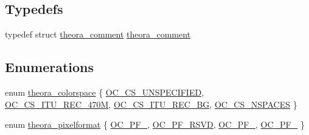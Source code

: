 \subsection*{Typedefs}
\begin{DoxyCompactItemize}
\item 
typedef struct \hyperlink{structtheora__comment}{theora\+\_\+comment} \hyperlink{group__oldfuncs_gaa504e8a56a4bf9c8e44f77d05aef0bb5}{theora\+\_\+comment}
\end{DoxyCompactItemize}
\subsection*{Enumerations}
\begin{DoxyCompactItemize}
\item 
enum \hyperlink{group__oldfuncs_gaa567da4ce591f7373149ce3ef3acdac9}{theora\+\_\+colorspace} \{ \hyperlink{group__oldfuncs_ggaa567da4ce591f7373149ce3ef3acdac9abf217cf83d7d7cbf73295e6689f5cf5f}{O\+C\+\_\+\+C\+S\+\_\+\+U\+N\+S\+P\+E\+C\+I\+F\+I\+ED}, 
\hyperlink{group__oldfuncs_ggaa567da4ce591f7373149ce3ef3acdac9ab20c9851a21ab148fef0bf2c00c0a294}{O\+C\+\_\+\+C\+S\+\_\+\+I\+T\+U\+\_\+\+R\+E\+C\+\_\+470M}, 
\hyperlink{group__oldfuncs_ggaa567da4ce591f7373149ce3ef3acdac9a04f8fa2da26f9ec513f514163705666a}{O\+C\+\_\+\+C\+S\+\_\+\+I\+T\+U\+\_\+\+R\+E\+C\+\_\+BG}, 
\hyperlink{group__oldfuncs_ggaa567da4ce591f7373149ce3ef3acdac9a640b572f11fa7102d434e1c605aaa186}{O\+C\+\_\+\+C\+S\+\_\+\+N\+S\+P\+A\+C\+ES}
 \}
\item 
enum \hyperlink{group__oldfuncs_gae169da05bfaaf4e964a6866552d45079}{theora\+\_\+pixelformat} \{ \hyperlink{group__oldfuncs_ggae169da05bfaaf4e964a6866552d45079a4e451af01be2645511b0e431f5225d2b}{O\+C\+\_\+\+P\+F\+\_}, 
\hyperlink{group__oldfuncs_ggae169da05bfaaf4e964a6866552d45079a7d21c63341ad299766839c83ed1216eb}{O\+C\+\_\+\+P\+F\+\_\+\+R\+S\+VD}, 
\hyperlink{group__oldfuncs_ggae169da05bfaaf4e964a6866552d45079a36a88c55b7ddd5aedeac2d61d57fee5b}{O\+C\+\_\+\+P\+F\+\_}, 
\hyperlink{group__oldfuncs_ggae169da05bfaaf4e964a6866552d45079a1d5c6d1b0365e06b4a87880b7825f044}{O\+C\+\_\+\+P\+F\+\_}
 \}
\end{DoxyCompactItemize}
